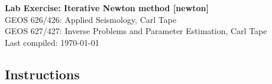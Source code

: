 \documentclass[11pt,titlepage,fleqn]{article}
\begin{document}

\begin{spacing}{1.2}
\centering
{\large \bf Lab Exercise: Iterative Newton method [newton]} \\
GEOS 626/426: Applied Seismology, Carl Tape \\
GEOS 627/427: Inverse Problems and Parameter Estimation, Carl Tape \\
Last compiled: \today
\end{spacing}


\subsection*{Instructions}
\end{document}
